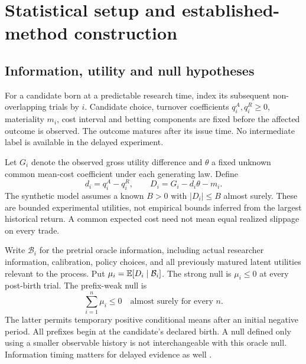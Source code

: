 \section{Statistical setup and established-method construction}
\label{sec:methods}
\subsection{Information, utility and null hypotheses}

For a candidate born at a predictable research time, index its subsequent
non-overlapping trials by $i$. Candidate choice, turnover coefficients $q^A_i,
q^R_i\geq0$, materiality $m_i$, cost interval and betting components are fixed
before the affected outcome is observed. The outcome matures after its issue
time. No intermediate label is available in the delayed experiment.

Let $G_i$ denote the observed gross utility difference and $\theta$ a fixed
unknown common mean-cost coefficient under each generating law. Define
\begin{equation}
 d_i=q^A_i-q^R_i,\qquad
 D_i=G_i-d_i\theta-m_i. \label{eq:latent}
\end{equation}
The synthetic model assumes a known $B>0$ with $|D_i|\leq B$ almost surely.
These are bounded experimental utilities, not empirical bounds inferred from
the largest historical return. A common expected cost need not mean equal
realized slippage on every trade.

Write $\mathcal B_i$ for the pretrial oracle information, including actual
researcher information, calibration, policy choices, and all previously matured
latent utilities relevant to the process. Put
$\mu_i=\mathbb{E}[D_i\mid\mathcal B_i]$. The strong null is $\mu_i\leq0$ at every
post-birth trial. The prefix-weak null is
\begin{equation}
 \sum_{i=1}^n\mu_i\leq0\quad\text{almost surely for every }n. \label{eq:weak}
\end{equation}
The latter permits temporary positive conditional means after an initial
negative period. All prefixes begin at the candidate's declared birth. A null
defined only using a smaller observable history is not interchangeable with
this oracle null. Information timing matters for delayed evidence as well
\citep{choefiltration2026}.

